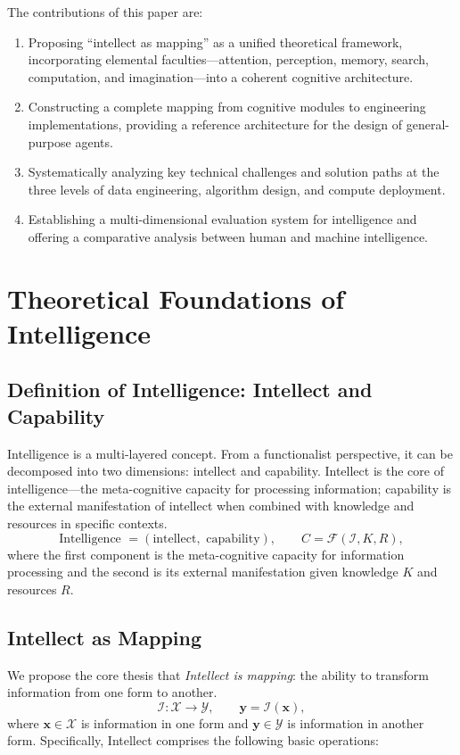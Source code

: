 \documentclass[12pt,a4paper]{article}
\newcommand{\Intell}{\mathcal{I}}
\begin{document}
The contributions of this paper are:
\begin{enumerate}
\item Proposing ``intellect as mapping'' as a unified theoretical framework, incorporating elemental faculties---attention, perception, memory, search, computation, and imagination---into a coherent cognitive architecture.
\item Constructing a complete mapping from cognitive modules to engineering implementations, providing a reference architecture for the design of general-purpose agents.
\item Systematically analyzing key technical challenges and solution paths at the three levels of data engineering, algorithm design, and compute deployment.
\item Establishing a multi-dimensional evaluation system for intelligence and offering a comparative analysis between human and machine intelligence.
\end{enumerate}

\section{Theoretical Foundations of Intelligence}
\subsection{Definition of Intelligence: Intellect and Capability}
Intelligence is a multi-layered concept. From a functionalist perspective, it can be decomposed into two dimensions: intellect and capability. Intellect is the core of intelligence---the meta-cognitive capacity for processing information; capability is the external manifestation of intellect when combined with knowledge and resources in specific contexts.
\begin{equation}
\text{Intelligence }=(\text{intellect},\text{ capability}),\qquad
C=\mathcal{F}\left(\Intell,K,R\right),
\label{eq:intelligence-decomp}
\end{equation}
where the first component is the meta-cognitive capacity for information processing and the second is its external manifestation given knowledge $K$ and resources $R$.

\subsection{Intellect as Mapping}
We propose the core thesis that \emph{Intellect is mapping}: the ability to transform information from one form to another.
\begin{equation}
\Intell:\mathcal{X}\to\mathcal{Y},\qquad \mathbf{y}=\Intell(\mathbf{x}),
\label{eq:mapping-def}
\end{equation}
where $\mathbf{x}\in\mathcal{X}$ is information in one form and $\mathbf{y}\in\mathcal{Y}$ is information in another form. Specifically, Intellect comprises the following basic operations:
\end{document}
